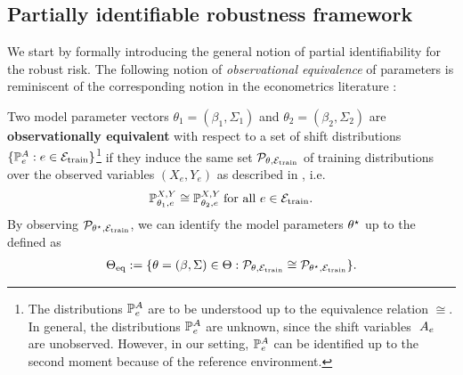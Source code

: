 \subsection{Partially identifiable robustness framework}\label{sec:prop-invariant-set}
We start by formally introducing the general notion of partial identifiability for the robust risk.
The following notion of \emph{observational equivalence} of parameters is reminiscent of the
corresponding notion in the econometrics literature \cite{Dufour2010Econometrics}:
\begin{definition}
 Two model parameter vectors $\theta_1 = (\beta_1, \Sigma_1)$ and $\theta_2 = (\beta_2, \Sigma_2)$ are \textbf{observationally equivalent} with respect to a set of shift distributions $\{ \mathbb{P}^{A}_{e}: e \in \mathcal{E}_{\mathrm{train}} \}$\footnote{The distributions $\mathbb{P}^{A}_{e}$ are to be understood up to the equivalence relation $\cong$. In general, the distributions $\mathbb{P}^{A}_{e}$ are unknown, since the shift variables $\
 A_e$ are unobserved. However, in our setting, $\mathbb{P}^{A}_{e}$ can be identified up to the second moment because of the reference environment.}  if they induce the same set $\mathcal{P}_{\theta, \mathcal{E}_{\mathrm{train}}}$ of training distributions over the observed variables $(X_e,Y_e)$ as 
described in \Cref{sec:training-data},
 i.e.
 \begin{align*}
    \mathbb{P}^{X,Y}_{\theta_1, e} \cong \mathbb{P}^{X,Y}_{\theta_2, e} \: \text{for all } e \in \mathcal{E}_{\mathrm{train}}.
 \end{align*}
    By observing $\mathcal{P}_{\theta^{\star}, \mathcal{E}_{\mathrm{train}}}$, we can identify the model parameters $\theta^{\star}$ up to the \textbf{\idset} defined as 
    \begin{align*}
       \Theta_{\mathrm{eq}} := \{ \theta = (\beta, \Sigma) \in \Theta: \mathcal{P}_{\theta, \mathcal{E}_{\mathrm{train}}} \cong \mathcal{P}_{\theta^{\star}, \mathcal{E}_{\mathrm{train}}} \}. 
    \end{align*}
\end{definition}
